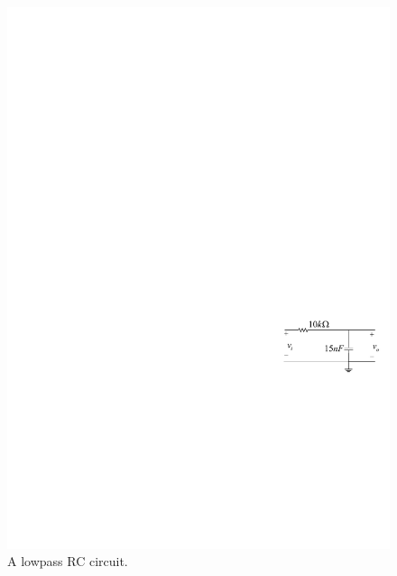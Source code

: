\documentclass[11pt]{article}
\begin{document}

\begin{question}


    \begin{figure}[H]
        \centering
        \includegraphics[scale=1.2,angle=0]{Fig/cir2.pdf}
        \caption{A lowpass RC circuit.} \label{fig:cir2}
    \end{figure}


\end{question}
\end{document}
